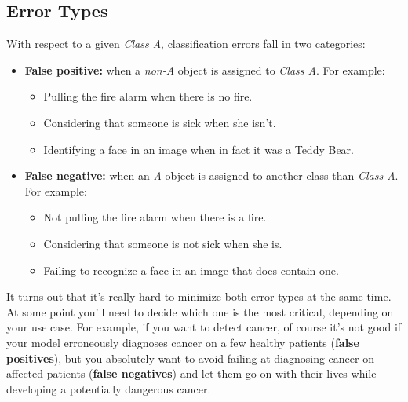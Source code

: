 \subsection*{Error Types}
With respect to a given \textit{Class A}, classification errors fall in two categories:
\begin{itemize}
    \item \textbf{False positive:} when a \textit{non-A} object is assigned to \textit{Class A}.
      For example:
      \begin{itemize}
          \item Pulling the fire alarm when there is no fire.
          \item Considering that someone is sick when she isn't.
          \item Identifying a face in an image when in fact it was a Teddy Bear.
      \end{itemize}
    
    \item \textbf{False negative:} when an \textit{A} object is assigned to another class than \textit{Class A}.
      For example:
      \begin{itemize}
          \item Not pulling the fire alarm when there is a fire.
          \item Considering that someone is not sick when she is.
          \item Failing to recognize a face in an image that does contain one.
      \end{itemize}
\end{itemize}

It turns out that it's really hard to minimize both error types at the same time.
At some point you'll need to decide which one is the most critical, depending on your use case.
For example, if you want to detect cancer, of course it's not good if your model erroneously diagnoses cancer on a few healthy patients (\textbf{false positives}), but you absolutely want to avoid failing at diagnosing cancer on affected patients (\textbf{false negatives}) and let them go on with their lives while developing a potentially dangerous cancer.

